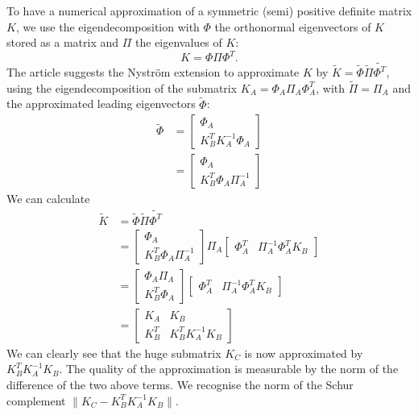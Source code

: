 To have a numerical approximation of a symmetric (semi) positive definite matrix \(K\), we use the eigendecomposition with \(\Phi\) the orthonormal eigenvectors of \(K\) stored as a matrix and \(\Pi\) the eigenvalues of \(K\):
\[K = \Phi \Pi \Phi^T.\]
The article \cite{fowlkes_spectral_2004} suggests the Nystr\"om extension to approximate \(K\) by \(\tilde{K} = \tilde{\Phi} \tilde{\Pi} \tilde{\Phi^T}\), using the eigendecomposition of the submatrix \(K_A = \Phi_A \Pi_A \Phi_A^T\), with \(\tilde{\Pi} = \Pi_A\) and the approximated leading eigenvectors \(\tilde{\Phi}\):
\begin{equation}
 \begin{split}
  \tilde{\Phi} & = \begin{bmatrix}\Phi_A \\ K_B^T K_A^{-1} \Phi_A \end{bmatrix} \\
               & = \begin{bmatrix}\Phi_A \\ K_B^T \Phi_A \Pi_A^{-1} \end{bmatrix}
 \end{split}
\end{equation}
We can calculate
\begin{equation}
 \begin{split}
     \tilde{K} & = \tilde{\Phi} \tilde{\Pi} \tilde{\Phi^T} \\
               & = \begin{bmatrix} \Phi_A \\ K_B^T \Phi_A \Pi_A^{-1} \end{bmatrix} \Pi_A \begin{bmatrix} \Phi_A^T & \Pi_A^{-1} \Phi_A^T K_B \end{bmatrix} \\
               & = \begin{bmatrix} \Phi_A \Pi_A \\ K_B^T \Phi_A \end{bmatrix} \begin{bmatrix} \Phi_A^T & \Pi_A^{-1} \Phi_A^T K_B \end{bmatrix} \\
               & = \begin{bmatrix} K_A & K_B \\ K_B^T & K_B^T K_A^{-1} K_B \end{bmatrix}
 \end{split}
\end{equation}
We can clearly see that the huge submatrix \(K_C\) is now approximated by \(K_B^T K_A^{-1} K_B\).
The quality of the approximation is measurable by the norm of the difference of the two above terms.
We recognise the norm of the Schur complement \(\| K_C - K_B^T K_A^{-1} K_B \| \).

